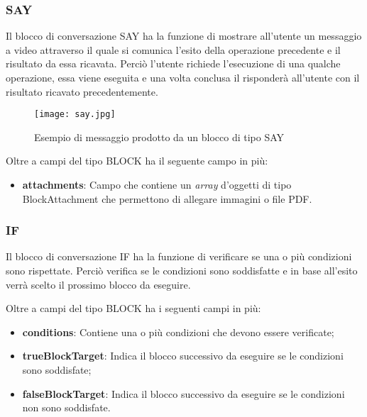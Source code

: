 \subsubsection{SAY}

Il blocco di conversazione SAY ha la funzione di mostrare all'utente un messaggio a video attraverso il quale si comunica l'esito della operazione precedente e il risultato da essa ricavata. Perciò l'utente richiede l'esecuzione di una qualche operazione, essa viene eseguita e una volta conclusa il  risponderà all'utente con il risultato ricavato precedentemente.

\begin{figure}[htbp]
	\centering
	\texttt{[image: say.jpg]}
	\caption{Esempio di messaggio prodotto da un blocco di tipo SAY}
\end{figure}
Oltre a campi del tipo BLOCK ha il seguente campo in più:

\begin{itemize}
	\item \textbf{attachments}: Campo che contiene un \emph{array} d'oggetti di tipo BlockAttachment che permettono di allegare immagini o file PDF.
\end{itemize}
\clearpage
\subsubsection{IF}

Il blocco di conversazione IF ha la funzione di verificare se una o più condizioni sono rispettate. Perciò verifica se le condizioni sono soddisfatte e in base all'esito verrà scelto il prossimo blocco da eseguire.

Oltre a campi del tipo BLOCK ha i seguenti campi in più:

\begin{itemize}
	\item \textbf{conditions}: Contiene una o più condizioni che devono essere verificate;
	\item \textbf{trueBlockTarget}: Indica il blocco successivo da eseguire se le condizioni sono soddisfate;
	\item \textbf{falseBlockTarget}: Indica il blocco successivo da eseguire se le condizioni non sono soddisfate.
\end{itemize}


